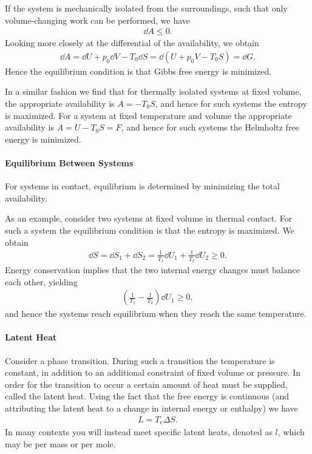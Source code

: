 If the system is mechanically isolated from the surroundings, such that only volume-changing work can be performed, we have
\begin{align*}
	\dd{A} \leq 0.
\end{align*}
Looking more closely at the differential of the availability, we obtain
\begin{align*}
	\dd{A} = \dd{U} + p_{0}\dd{V} - T_{0}\dd{S} = \dd(U + p_{0}V - T_{0}S) = \dd{G}.
\end{align*}
Hence the equilibrium condition is that Gibbs free energy is minimized.

In a similar fashion we find that for thermally isolated systems at fixed volume, the appropriate availability is $A = -T_{0}S$, and hence for such systems the entropy is maximized. For a system at fixed temperature and volume the appropriate availability is $A = U - T_{0}S = F$, and hence for such systems the Helmholtz free energy is minimized.

\paragraph{Equilibrium Between Systems}
For systems in contact, equilibrium is determined by minimizing the total availability.

As an example, consider two systems at fixed volume in thermal contact. For such a system the equilibrium condition is that the entropy is maximized. We obtain
\begin{align*}
	\dd{S} = \dd{S_{1}} + \dd{S_{2}} = \frac{1}{T_{1}}\dd{U_{1}} + \frac{1}{T_{2}}\dd{U_{2}} \geq 0.
\end{align*}
Energy conservation implies that the two internal energy changes must balance each other, yielding
\begin{align*}
	\left(\frac{1}{T_{1}} - \frac{1}{T_{2}}\right)\dd{U_{1}} \geq 0,
\end{align*}
and hence the systems reach equilibrium when they reach the same temperature.

\paragraph{Latent Heat}
Consider a phase transition. During such a transition the temperature is constant, in addition to an additional constraint of fixed volume or pressure. In order for the transition to occur a certain amount of heat must be supplied, called the latent heat. Using the fact that the free energy is continuous (and attributing the latent heat to a change in internal energy or enthalpy) we have
\begin{align*}
	L = T_{\text{c}}\Delta S.
\end{align*}
In many contexts you will instead meet specific latent heats, denoted as $l$, which may be per mass or per mole.

